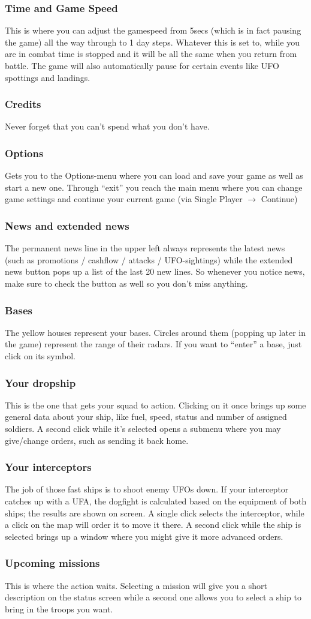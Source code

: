 \subsubsection{Time and Game Speed}
This is where you can adjust the gamespeed from 5secs (which is in fact pausing the game) all the way through to 1 day steps. Whatever this is set to, while you are in combat time is stopped and it will be all the same when you return from battle.  The game will also automatically pause for certain events like UFO spottings and landings.
\subsubsection{Credits}
Never forget that you can't spend what you don't have.
\subsubsection{Options}
Gets you to the Options-menu where you can load and save your game as well as start a new one.
Through ``exit'' you reach the main menu where you can change game settings and continue your current game (via Single Player $\rightarrow$ Continue)
\subsubsection{News and extended news}
The permanent news line in the upper left always represents the latest news (such as promotions / cashflow / attacks / UFO-sightings) while the extended news button pops up a list of the last 20 new lines. So whenever you notice news, make sure to check the button as well so you don't miss anything. 
\subsubsection{Bases}
The yellow houses represent your bases. Circles around them (popping up later in the game) represent the range of their radars. If you want to ``enter'' a base, just click on its symbol.
\subsubsection{Your dropship}
This is the one that gets your squad to action. Clicking on it once brings up some general data about your ship, like fuel, speed, status and number of assigned soldiers. A second click while it's selected opens a submenu where you may give/change orders, such as sending it back home.
\subsubsection{Your interceptors}
The job of those fast ships is to shoot enemy UFOs down. If your interceptor catches up with a UFA, the dogfight is calculated based on the equipment of both ships; the results are shown on screen. A single click selects the interceptor, while a click on the map will order it to move it there. A second click while the ship is selected brings up a window where you might give it more advanced orders.
\subsubsection{Upcoming missions}
This is where the action waits. Selecting a mission will give you a short description on the status screen while a second one allows you to select a ship to bring in the troops you want.